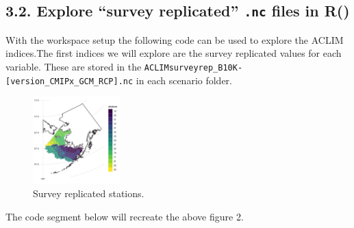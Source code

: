 \documentclass[
]{article}
\begin{document}
\hypertarget{explore-survey-replicated-.nc-files-in-r}{%
\subsection{\texorpdfstring{3.2. Explore ``survey replicated''
\texttt{.nc} files in
R()}{3.2. Explore ``survey replicated'' .nc files in R()}}\label{explore-survey-replicated-.nc-files-in-r}}

With the workspace setup the following code can be used to explore the
ACLIM indices.The first indices we will explore are the survey
replicated values for each variable. These are stored in the
\texttt{ACLIMsurveyrep\_B10K-{[}version\_CMIPx\_GCM\_RCP{]}.nc} in each
scenario folder.

\begin{figure}
\centering
\includegraphics[width=0.3\textwidth,height=\textheight]{Figs/stations.jpg}
\caption{Survey replicated stations.}
\end{figure}

The code segment below will recreate the above figure 2.
\end{document}
